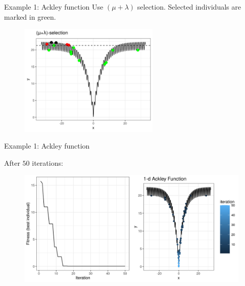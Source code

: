 \documentclass[11pt,compress,t,notes=noshow, xcolor=table]{beamer}
\begin{document}
\begin{vbframe}{Example 1: Ackley function}
Use $(\mu + \lambda)$ selection.
Selected individuals are marked in green.

\medskip

\begin{center}
\begin{figure}
  \includegraphics[width=0.6\textwidth]{figure_man/1dim-ackley-func-selection.png}
\end{figure}
\end{center}


\end{vbframe}

\begin{vbframe}{Example 1: Ackley function}

After $50$ iterations: 

\vspace{0.5cm}

\begin{center}
\begin{figure}
  \includegraphics[width=1\textwidth]{figure_man/1dim-ackley-func-final.png}
\end{figure}
\end{center}

\end{vbframe}
\end{document}
